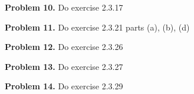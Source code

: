 \documentclass[oneside,12pt]{amsart}
\begin{document}
\textbf{Problem 10.} Do exercise 2.3.17

\bigskip
\bigskip
\bigskip
\bigskip
\bigskip
\bigskip
\bigskip
\bigskip
\bigskip
\bigskip


\textbf{Problem 11.} Do exercise 2.3.21 parts (a), (b), (d)

\bigskip
\bigskip
\bigskip
\bigskip
\bigskip
\bigskip
\bigskip
\bigskip
\bigskip
\bigskip

\textbf{Problem 12.} Do exercise 2.3.26

\bigskip
\bigskip
\bigskip
\bigskip
\bigskip
\bigskip
\bigskip
\bigskip
\bigskip
\bigskip

\textbf{Problem 13.} Do exercise 2.3.27

\bigskip
\bigskip
\bigskip
\bigskip
\bigskip
\bigskip
\bigskip
\bigskip
\bigskip
\bigskip

\textbf{Problem 14.} Do exercise 2.3.29
\end{document}
